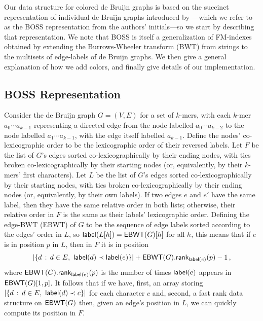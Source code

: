 \label{sec:methods}

Our data structure for colored de Bruijn graphs is based on the succinct representation of individual de Bruijn graphs introduced by \cite{BOSS12}---which we refer to as the BOSS representation from the authors' initials---so we start by describing that representation.  We note that BOSS is itself a generalization of FM-indexes~\citep{FM05} obtained by extending the Burrows-Wheeler transform (BWT) from strings to the multisets of edge-labels of de Bruijn graphs.  We then give a general explanation of how we add colors, and finally give details of our implementation.

\subsection{BOSS Representation}
\label{subsec:boss}

Consider the de Bruijn graph \(G = (V, E)\) for a set of $k$-mers, with each $k$-mer \(a_0 \cdots a_{k - 1}\) representing a directed edge from the node labelled \(a_0 \cdots a_{k - 2}\) to the node labelled \(a_1 \cdots a_{k - 1}\), with the edge itself labelled \(a_{k - 1}\).  Define the nodes' co-lexicographic order to be the lexicographic order of their reversed labels.  Let $F$ be the list of $G$'s edges sorted co-lexicographically by their ending nodes, with ties broken co-lexicographically by their starting nodes (or, equivalently, by their $k$-mers' first characters).  Let $L$ be the list of $G$'s edges sorted co-lexicographically by their starting nodes, with ties broken co-lexicographically by their ending nodes (or, equivalently, by their own labels).  If two edges $e$ and $e'$ have the same label, then they have the same relative order in both lists; otherwise, their relative order in $F$ is the same as their labels' lexicographic order.  Defining the edge-BWT (EBWT) of $G$ to be the sequence of edge labels sorted according to the edges' order in $L$, so \(\mathsf{label} (L [h]) = \mathsf{EBWT} (G) [h]\) for all $h$, this means that if $e$ is in position $p$ in $L$, then in $F$ it is in position
\begin{equation*}
|\{d\,:\,d \in E,\ \elabel (d) \prec \elabel (e)\}| + \EBWT (G).\rank_{\elabel (e)} (p) - 1\,,
\end{equation*}
where \(\mathsf{EBWT} (G).\mathsf{rank}_{\mathsf{label} (e)} (p)\) is the number of times $\mathsf{label} (e)$ appears in \(\mathsf{EBWT} (G) [1,p]\).  It follows that if we have, first, an array storing \(|\{d\,:\,d \in E,\ \mathsf{label} (d) \prec c\}|\) for each character $c$ and, second, a fast rank data structure on \(\mathsf{EBWT} (G)\) then, given an edge's position in $L$, we can quickly compute its position in $F$.

